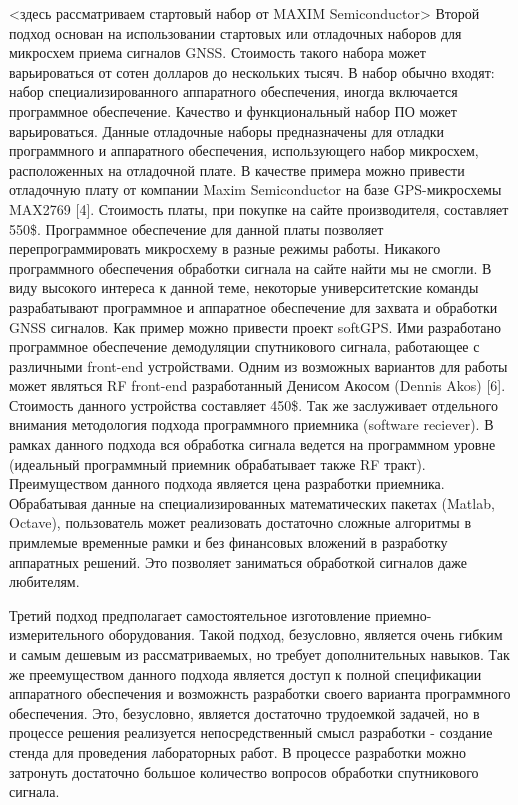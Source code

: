 \documentclass[a4paper,12pt]{article}
\numberwithin{equation}{section}		%
\numberwithin{table}{section}
\begin{document}
<здесь рассматриваем стартовый набор от MAXIM Semiconductor>
Второй подход основан на использовании стартовых или отладочных наборов для микросхем приема сигналов GNSS. Стоимость такого набора может варьироваться от сотен
долларов до нескольких тысяч. В набор обычно входят: набор специализированного аппаратного обеспечения, иногда включается программное обеспечение. Качество и
функциональный набор ПО может варьироваться. Данные отладочные наборы предназначены для отладки программного и аппаратного обеспечения, использующего набор
микросхем, расположенных на отладочной плате.
В качестве примера можно привести отладочную плату от компании Maxim Semiconductor на базе GPS-микросхемы MAX2769 [4]. Стоимость платы, при покупке на сайте
производителя, составляет 550\$. Программное обеспечение для данной платы позволяет перепрограммировать микросхему в разные режимы работы. Никакого программного
обеспечения обработки сигнала на сайте найти мы не смогли.
В виду высокого интереса к данной теме, некоторые университетские команды разрабатывают программное и аппаратное обеспечение для захвата и обработки GNSS сигналов.
Как пример можно привести проект softGPS. Ими разработано программное обеспечение демодуляции спутникового сигнала, работающее с различными front-end устройствами.
Одним из возможных вариантов для работы может являться RF front-end разработанный Денисом Акосом (Dennis Akos) [6]. Стоимость данного устройства составляет 450\$.
Так же заслуживает отдельного внимания методология подхода программного приемника (software reciever). В рамках данного подхода вся обработка сигнала ведется на
программном уровне (идеальный программный приемник обрабатывает также RF тракт). Преимуществом данного подхода является цена разработки приемника.
Обрабатывая данные на специализированных математических пакетах (Matlab, Octave), пользователь может реализовать достаточно сложные алгоритмы в примлемые
временные рамки и без финансовых вложений в разработку аппаратных решений. Это позволяет заниматься обработкой сигналов даже любителям.

Третий подход предполагает самостоятельное изготовление приемно-измерительного оборудования. Такой подход, безусловно, является очень гибким и самым дешевым из
рассматриваемых, но требует дополнительных навыков. Так же преемуществом данного подхода является доступ к полной спецификации аппаратного обеспечения и возможнсть
разработки своего варианта программного обеспечения. Это, безусловно, является достаточно трудоемкой задачей, но в процессе решения реализуется непосредственный
смысл разработки - создание стенда для проведения лабораторных работ. В процессе разработки можно затронуть достаточно большое количество вопросов обработки
спутникового сигнала. 
\end{document}
